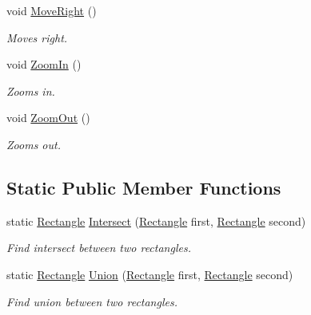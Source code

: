 \begin{DoxyCompactItemize}
void \mbox{\hyperlink{class_test_project_1_1_task_library_1_1_tasks_1_1_lesson6_1_1_models_1_1_rectangle_a794f5d29886b4dd004db176c553d5597}{Move\+Right}} ()
\begin{DoxyCompactList}\small\item\em Moves right. \end{DoxyCompactList}\item 
void \mbox{\hyperlink{class_test_project_1_1_task_library_1_1_tasks_1_1_lesson6_1_1_models_1_1_rectangle_a3e04e783432b8419633128bc394fb173}{Zoom\+In}} ()
\begin{DoxyCompactList}\small\item\em Zooms in. \end{DoxyCompactList}\item 
void \mbox{\hyperlink{class_test_project_1_1_task_library_1_1_tasks_1_1_lesson6_1_1_models_1_1_rectangle_a209c6d610377927da638f31feecfbed0}{Zoom\+Out}} ()
\begin{DoxyCompactList}\small\item\em Zooms out. \end{DoxyCompactList}\end{DoxyCompactItemize}
\subsection*{Static Public Member Functions}
\begin{DoxyCompactItemize}
\item 
static \mbox{\hyperlink{class_test_project_1_1_task_library_1_1_tasks_1_1_lesson6_1_1_models_1_1_rectangle}{Rectangle}} \mbox{\hyperlink{class_test_project_1_1_task_library_1_1_tasks_1_1_lesson6_1_1_models_1_1_rectangle_a8668c0fab1185332bb0233dba3673b8c}{Intersect}} (\mbox{\hyperlink{class_test_project_1_1_task_library_1_1_tasks_1_1_lesson6_1_1_models_1_1_rectangle}{Rectangle}} first, \mbox{\hyperlink{class_test_project_1_1_task_library_1_1_tasks_1_1_lesson6_1_1_models_1_1_rectangle}{Rectangle}} second)
\begin{DoxyCompactList}\small\item\em Find intersect between two rectangles. \end{DoxyCompactList}\item 
static \mbox{\hyperlink{class_test_project_1_1_task_library_1_1_tasks_1_1_lesson6_1_1_models_1_1_rectangle}{Rectangle}} \mbox{\hyperlink{class_test_project_1_1_task_library_1_1_tasks_1_1_lesson6_1_1_models_1_1_rectangle_a3da65a7a9d7e5b6cb3766c7128a49e26}{Union}} (\mbox{\hyperlink{class_test_project_1_1_task_library_1_1_tasks_1_1_lesson6_1_1_models_1_1_rectangle}{Rectangle}} first, \mbox{\hyperlink{class_test_project_1_1_task_library_1_1_tasks_1_1_lesson6_1_1_models_1_1_rectangle}{Rectangle}} second)
\begin{DoxyCompactList}\small\item\em Find union between two rectangles. \end{DoxyCompactList}\end{DoxyCompactItemize}
